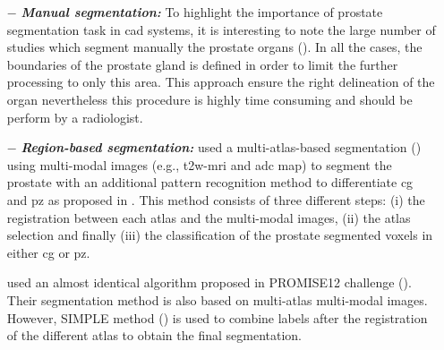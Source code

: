 \begin{enumerate}[leftmargin=*]

\item[$-$] \textbf{\textit{Manual segmentation:}} To highlight the importance of prostate segmentation task in \ac{cad} systems, it is interesting to note the large number of studies which segment manually the prostate organs (\cite{Artan2009,Artan2010,Matulewicz2013,Niaf2011,Niaf2012,Ozer2009,Ozer2010,Puech2009,Vos2008,Vos2008a}). In all the cases, the boundaries of the prostate gland is defined in order to limit the further processing to only this area. This approach ensure the right delineation of the organ nevertheless this procedure is highly time consuming and should be perform by a radiologist.

\item[$-$] \textbf{\textit{Region-based segmentation:}} \cite{Litjens2012} used a multi-atlas-based segmentation (\cite{Klein2008}) using multi-modal images (e.g., \ac{t2w}-\ac{mri} and \ac{adc} map) to segment the prostate with an additional pattern recognition method to differentiate \ac{cg} and \ac{pz} as proposed in \cite{Litjens2012a}. This method consists of three different steps: (i) the registration between each atlas and the multi-modal images, (ii) the atlas selection and finally (iii) the classification of the prostate segmented voxels in either \ac{cg} or \ac{pz}. 

{\color{red}\cite{Litjens2014} used an almost identical algorithm proposed in PROMISE12 challenge (\cite{Litjens2014a}). Their segmentation method is also based on multi-atlas multi-modal images. However, SIMPLE method (\cite{Langerak2010}) is used to combine labels after the registration of the different atlas to obtain the final segmentation.}


\end{enumerate}
